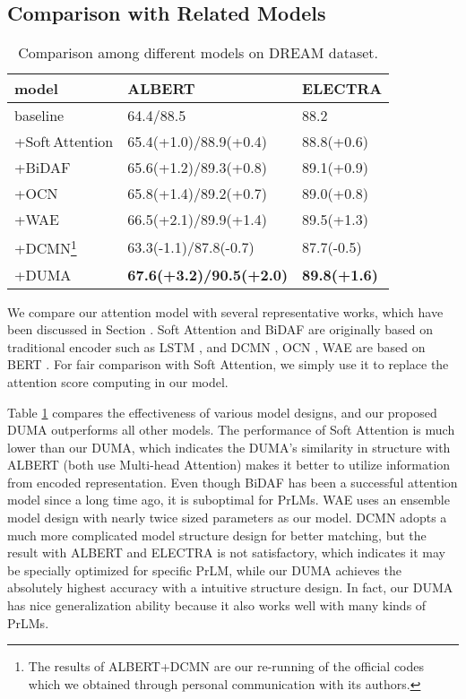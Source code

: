 \documentclass[letterpaper]{article} \usepackage{aaai21}  \usepackage{times}  \usepackage{helvet} \usepackage{courier}  \usepackage[hyphens]{url}  \usepackage{graphicx} \urlstyle{rm} \def\UrlFont{\rm}  \usepackage{natbib}  \usepackage{caption} \frenchspacing  \setlength{\pdfpagewidth}{8.5in}  \setlength{\pdfpageheight}{11in}
\begin{document}
\subsection{Comparison with Related Models}
\begin{table}[t]\small
\renewcommand\arraystretch{1.3}
	\centering
	{
		\begin{tabular}{@{}p{2.65cm}|l|p{1.85cm}}
			\hline		
			 model & ALBERT  & ELECTRA   \\
			\hline
			\hline
			baseline & 64.4/88.5 & 88.2	 \\
			\hline
			+Soft\,Attention\shortcite{nmt_attention}& 65.4(+1.0)/88.9(+0.4) & 88.8(+0.6) \\
			+BiDAF\shortcite{bidaf} & 65.6(+1.2)/89.3(+0.8) & 89.1(+0.9)\\
			+OCN\shortcite{ocn} &65.8(+1.4)/89.2(+0.7)  & 89.0(+0.8) \\
			+WAE\shortcite{bert_wae} & 66.5(+2.1)/89.9(+1.4) & 89.5(+1.3) \\
			
			+DCMN\footnote{The results of ALBERT+DCMN are our re-running of the official codes which we obtained through personal communication with its authors.}\shortcite{dcmn} & 63.3(-1.1)/87.8(-0.7)  & 87.7(-0.5)\\
			\hline
			+DUMA & \textbf{67.6(+3.2)/90.5(+2.0)} & \textbf{89.8(+1.6)}  \\
			\hline
		\end{tabular}
	}
	\caption{\label{attention_comparison} Comparison among different models on DREAM dataset.}
\end{table}

We compare our attention model with several representative works, which have been discussed in Section \textit{}. Soft Attention \cite{nmt_attention} and BiDAF \cite{bidaf} are originally based on traditional encoder such as LSTM \cite{lstm}, and DCMN \cite{dcmn}, OCN \cite{ocn}, WAE\cite{bert_wae} are based on BERT \cite{bert}. For fair comparison with Soft Attention, we simply use it to replace the attention score computing in our model. 

Table \ref{attention_comparison} compares the effectiveness of various model designs, and our proposed DUMA outperforms all other models. The performance of Soft Attention is much lower than our DUMA, which indicates the DUMA's similarity in structure with ALBERT (both use Multi-head Attention) makes it better to utilize information from encoded representation. Even though BiDAF has been a successful attention model since a long time ago, it is suboptimal for PrLMs. WAE uses an ensemble model design with nearly twice sized parameters as our model. DCMN adopts a much more complicated model structure design for better matching, but the result with ALBERT and ELECTRA is not satisfactory, which indicates it may be specially optimized for specific PrLM, while our DUMA achieves the absolutely highest accuracy with a intuitive structure design. In fact, our DUMA has nice generalization ability because it also works well with many kinds of PrLMs.
\end{document}
